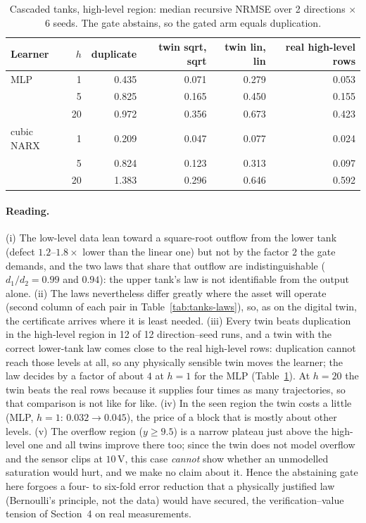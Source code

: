 \begin{table}[h]
\centering\small
\caption{Cascaded tanks, high-level region: median recursive NRMSE over 2 directions $\times$ 6 seeds. The gate abstains, so the gated arm equals duplication.}
\label{tab:tanks-results}
\begin{tabular}{lrrrrr}
\toprule
Learner & $h$ & duplicate & twin sqrt, sqrt & twin lin, lin & real high-level rows\\
\midrule
MLP & 1 & 0.435 & 0.071 & 0.279 & 0.053\\
 & 5 & 0.825 & 0.165 & 0.450 & 0.155\\
 & 20 & 0.972 & 0.356 & 0.673 & 0.423\\
cubic NARX & 1 & 0.209 & 0.047 & 0.077 & 0.024\\
 & 5 & 0.824 & 0.123 & 0.313 & 0.097\\
 & 20 & 1.383 & 0.296 & 0.646 & 0.592\\
\bottomrule
\end{tabular}
\end{table}
\paragraph{Reading.} (i) The low-level data lean toward a square-root outflow from the lower tank (defect $1.2$--$1.8\times$ lower than the linear one) but not by the factor $2$ the gate demands, and the two laws that share that outflow are indistinguishable ($d_1/d_2=0.99$ and $0.94$): the upper tank's law is not identifiable from the output alone. (ii) The laws nevertheless differ greatly where the asset will operate (second column of each pair in Table~\ref{tab:tanks-laws}), so, as on the digital twin, the certificate arrives where it is least needed. (iii) Every twin beats duplication in the high-level region in 12 of 12 direction--seed runs, and a twin with the correct lower-tank law comes close to the real high-level rows: duplication cannot reach those levels at all, so any physically sensible twin moves the learner; the law decides by a factor of about $4$ at $h=1$ for the MLP (Table~\ref{tab:tanks-results}). At $h=20$ the twin beats the real rows because it supplies four times as many trajectories, so that comparison is not like for like. (iv) In the seen region the twin costs a little (MLP, $h=1$: $0.032\to0.045$), the price of a block that is mostly about other levels. (v) The overflow region ($y\ge9.5$) is a narrow plateau just above the high-level one and all twins improve there too; since the twin does not model overflow and the sensor clips at $10$\,V, this case \emph{cannot} show whether an unmodelled saturation would hurt, and we make no claim about it. Hence the abstaining gate here forgoes a four- to six-fold error reduction that a physically justified law (Bernoulli's principle, not the data) would have secured, the verification--value tension of Section~4 on real measurements.

